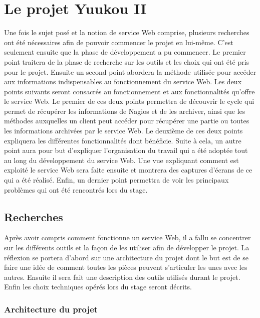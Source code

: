 \chapter{Le projet Yuukou II}

Une fois le sujet pos\'e et la notion de service Web comprise, plusieurs recherches ont \'et\'e n\'ecessaires afin de pouvoir commencer le projet en lui-m\^eme.
C'est seulement ensuite que la phase de d\'eveloppement a pu commencer.
Le premier point traitera de la phase de recherche sur les outils et les choix qui ont \'et\'e pris pour le projet.
Ensuite un second point abordera la m\'ethode utilis\'ee pour acc\'eder aux informations indispensables au fonctionnement du service Web.
Les deux points suivants seront consacr\'es au fonctionnement et aux fonctionnalit\'es qu'offre le service Web.
Le premier de ces deux points permettra de d\'ecouvrir le cycle qui permet de r\'ecup\'erer les informations de Nagios et de les archiver, ainsi que les m\'ethodes auxquelles un client peut acc\'eder pour r\'ecup\'erer une partie ou toutes les informations archiv\'ees par le service Web.
Le deuxi\`eme de ces deux points expliquera les diff\'erentes fonctionnalit\'es dont {\YuukouII} b\'en\'eficie.
Suite \`a cela, un autre point aura pour but d'expliquer l'organisation du travail qui a \'et\'e adopt\'ee tout au long du d\'eveloppement du service Web.
Une vue expliquant comment est exploit\'e le service Web sera faite ensuite et montrera des captures d'\'ecrans de ce qui a \'et\'e r\'ealis\'e.
Enfin, un dernier point permettra de voir les principaux probl\`emes qui ont \'et\'e rencontr\'es lors du stage.

\section{Recherches}

Apr\`es avoir compris comment fonctionne un service Web, il a fallu se concentrer sur les diff\'erents outils et la fa\c{c}on de les utiliser afin de d\'evelopper le projet.
La r\'eflexion se portera d'abord sur une architecture du projet dont le but est de se faire une id\'ee de comment toutes les pi\`eces peuvent s'articuler les unes avec les autres.
Ensuite il sera fait une description des outils utilis\'es durant le projet.
Enfin les choix techniques op\'er\'es lors du stage seront d\'ecrits.

\subsection{Architecture du projet}
\label{section:architectureProjet}


